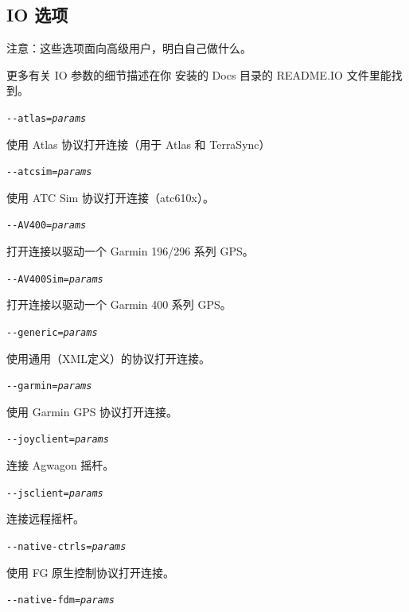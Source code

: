{
  \subsection{IO 选项}
注意：这些选项面向高级用户，明白自己做什么。

更多有关 IO 参数的细节描述在你 \FlightGear{} 安装的 Docs 目录的 README.IO 文件里能找到。

\begin{itemize}

  \item{\texttt{-$ $-atlas={\it params}}}

  使用 Atlas 协议打开连接（用于 Atlas 和 TerraSync）

 \item{\texttt{-$ $-atcsim={\it params}}}

  使用 ATC Sim 协议打开连接（atc610x）。

 \item{\texttt{-$ $-AV400={\it params}}}

  打开连接以驱动一个 Garmin 196/296 系列 GPS。 

 \item{\texttt{-$ $-AV400Sim={\it params}}}

  打开连接以驱动一个 Garmin 400 系列 GPS。

 \item{\texttt{-$ $-generic={\it params}}}

  使用通用（XML定义）的协议打开连接。

 \item{\texttt{-$ $-garmin={\it params}}}
   
  使用 Garmin GPS 协议打开连接。

 \item{\texttt{-$ $-joyclient={\it params}}}
  
  连接 Agwagon 摇杆。

 \item{\texttt{-$ $-jsclient={\it params}}}

  连接远程摇杆。

 \item{\texttt{-$ $-native-ctrls={\it params}}

  使用 FG 原生控制协议打开连接。

 \item{\texttt{-$ $-native-fdm={\it params}}}

}
\end{itemize}}
